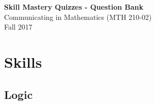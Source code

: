 \documentclass[11pt]{article}
\begin{document}
\vspace{-1.2in}
\begin{center} \textbf{\Large{Skill Mastery Quizzes - Question Bank}} \\
Communicating in Mathematics (MTH 210-02)\\
Fall 2017
\end{center}



\section*{Skills}


\subsection*{Logic}
\end{document}

